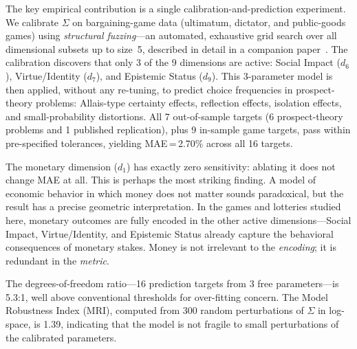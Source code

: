 \documentclass[journal]{IEEEtran}
\begin{document}
The key empirical contribution is a single calibration-and-prediction experiment.
We calibrate $\Sigma$ on bargaining-game data (ultimatum, dictator, and public-goods games) using \emph{structural fuzzing}---an automated, exhaustive grid search over all dimensional subsets up to size~5, described in detail in a companion paper~\cite{bond2026fuzz}.
The calibration discovers that only 3 of the 9 dimensions are active: Social Impact ($d_6$), Virtue/Identity ($d_7$), and Epistemic Status ($d_9$).
This 3-parameter model is then applied, without any re-tuning, to predict choice frequencies in prospect-theory problems: Allais-type certainty effects, reflection effects, isolation effects, and small-probability distortions.
All 7 out-of-sample targets (6 prospect-theory problems and 1 published replication), plus 9 in-sample game targets, pass within pre-specified tolerances, yielding MAE\,=\,2.70\% across all 16 targets.

The monetary dimension ($d_1$) has exactly zero sensitivity: ablating it does not change MAE at all.
This is perhaps the most striking finding.
A model of economic behavior in which money does not matter sounds paradoxical, but the result has a precise geometric interpretation.
In the games and lotteries studied here, monetary outcomes are fully encoded in the other active dimensions---Social Impact, Virtue/Identity, and Epistemic Status already capture the behavioral consequences of monetary stakes.
Money is not irrelevant to the \emph{encoding}; it is redundant in the \emph{metric}.

The degrees-of-freedom ratio---16 prediction targets from 3 free parameters---is 5.3:1, well above conventional thresholds for over-fitting concern.
The Model Robustness Index (MRI), computed from 300 random perturbations of $\Sigma$ in log-space, is 1.39, indicating that the model is not fragile to small perturbations of the calibrated parameters.
\end{document}
